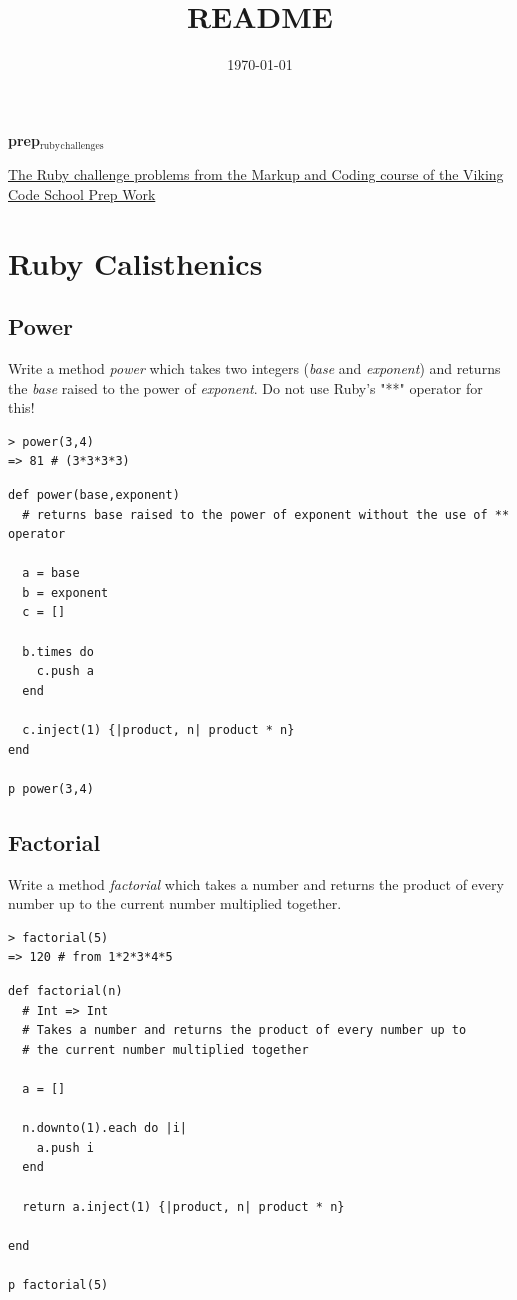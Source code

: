 \documentclass[11pt]{article}
\date{\today}
\title{README}
\begin{document}
\maketitle
\textbf{prep$_{\text{ruby}}$$_{\text{challenges}}$}

\href{http://www.vikingcodeschool.com/web-markup-and-coding/level-up-your-ruby-judo}{The Ruby challenge problems from the Markup and Coding course of the Viking Code School Prep Work}

\section{Ruby Calisthenics}
\label{sec-1}

\subsection{Power}
\label{sec-1-1}

Write a method \emph{power} which takes two integers (\emph{base} and \emph{exponent}) and 
returns the \emph{base} raised to the power of \emph{exponent}. Do not use Ruby's "**"
operator for this!

\begin{verbatim}
> power(3,4)
=> 81 # (3*3*3*3)
\end{verbatim}

\begin{verbatim}
def power(base,exponent)
  # returns base raised to the power of exponent without the use of ** operator

  a = base
  b = exponent
  c = []

  b.times do
    c.push a
  end

  c.inject(1) {|product, n| product * n}
end

p power(3,4)
\end{verbatim}

\subsection{Factorial}
\label{sec-1-2}

Write a method \emph{factorial} which takes a number and returns the product of 
every number up to the current number multiplied together.

\begin{verbatim}
> factorial(5)
=> 120 # from 1*2*3*4*5
\end{verbatim}

\begin{verbatim}
def factorial(n)
  # Int => Int
  # Takes a number and returns the product of every number up to 
  # the current number multiplied together

  a = []

  n.downto(1).each do |i|
    a.push i
  end

  return a.inject(1) {|product, n| product * n}

end

p factorial(5)
\end{verbatim}
\end{document}

